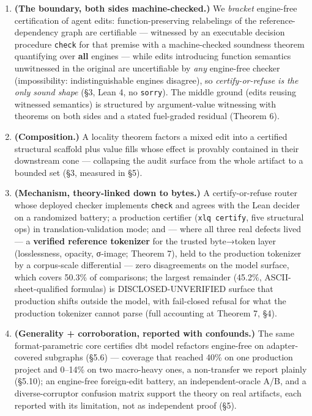 \documentclass[
  11pt,
]{article}
\providecommand{\tightlist}{%
  \setlength{\itemsep}{0pt}\setlength{\parskip}{0pt}}
\begin{document}
\begin{enumerate}
\def\labelenumi{\arabic{enumi}.}
\tightlist
\item
  \textbf{(The boundary, both sides machine-checked.)} We \emph{bracket}
  engine-free certification of agent edits: function-preserving
  relabelings of the reference-dependency graph are certifiable ---
  witnessed by an executable decision procedure \texttt{check} for that
  premise with a machine-checked soundness theorem quantifying over
  \textbf{all} engines --- while edits introducing function semantics
  unwitnessed in the original are uncertifiable by \emph{any}
  engine-free checker (impossibility: indistinguishable engines
  disagree), so \emph{certify-or-refuse is the only sound shape} (§3,
  Lean 4, no \texttt{sorry}). The middle ground (edits reusing witnessed
  semantics) is structured by argument-value witnessing with theorems on
  both sides and a stated fuel-graded residual (Theorem 6).
\item
  \textbf{(Composition.)} A locality theorem factors a mixed edit into a
  certified structural scaffold plus value fills whose effect is
  provably contained in their downstream cone --- collapsing the audit
  surface from the whole artifact to a bounded set (§3, measured in §5).
\item
  \textbf{(Mechanism, theory-linked down to bytes.)} A certify-or-refuse
  router whose deployed checker implements \texttt{check} and agrees
  with the Lean decider on a randomized battery; a production certifier
  (\texttt{xlq\ certify}, five structural ops) in translation-validation
  mode; and --- where all three real defects lived --- a
  \textbf{verified reference tokenizer} for the trusted byte→token layer
  (losslessness, opacity, σ-image; Theorem 7), held to the production
  tokenizer by a corpus-scale differential --- zero disagreements on the
  model surface, which covers 50.3\% of comparisons; the largest
  remainder (45.2\%, ASCII-sheet-qualified formulas) is
  DISCLOSED-UNVERIFIED surface that production shifts outside the model,
  with fail-closed refusal for what the production tokenizer cannot
  parse (full accounting at Theorem 7, §4).
\item
  \textbf{(Generality + corroboration, reported with confounds.)} The
  same format-parametric core certifies dbt model refactors engine-free
  on adapter-covered subgraphs (§5.6) --- coverage that reached 40\% on
  one production project and 0--14\% on two macro-heavy ones, a
  non-transfer we report plainly (§5.10); an engine-free foreign-edit
  battery, an independent-oracle A/B, and a diverse-corruptor confusion
  matrix support the theory on real artifacts, each reported with its
  limitation, not as independent proof (§5).
\end{enumerate}
\end{document}
